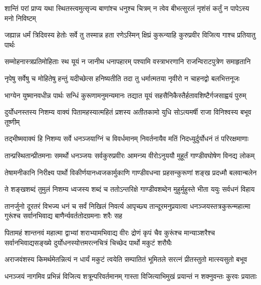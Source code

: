 \twolineshloka
{शान्तिं परां प्राप्य यथा स्थितस्त्वमुत्सृज्य बाणांश्च धनुश्च चित्रम्}
{न त्वेव बीभत्सुरलं नृशंसं कर्तुं न पापेऽस्य मनो निविष्टम्}


\twolineshloka
{जह्यान्न धर्मं त्रिदिवस्य हेतोः सर्वे तु तस्मान्न हता रणेऽस्मिन्}
{क्षिप्रं कुरून्याहि कुरुप्रवीर विजित्य गाश्च प्रतियातु पार्थः}


\twolineshloka
{सम्मोहनास्त्रप्रतिमोहिताः स्थ यूयं न जानीथ धनापहारम्}
{पश्यामि वस्त्राभरणानि राजन्विराटपुत्रेण समाहृतानि}


\twolineshloka
{नृपेषु सर्वेषु च मोहितेषु हन्तुं यदीच्छेत्स हनिष्यतीति}
{तदा तु धर्मात्मतया नृवीरो न चाहनद्वो बलभित्तनूजः}


\twolineshloka
{भाग्येन युष्मानवधीन्न पार्थः सन्धिं कुरूणामनुमन्यमानः}
{तद्यात यूयं सहसैनिकैस्तैर्हतावशिष्टैर्गजसाह्वयं पुरुम्}



\twolineshloka
{दुर्योधनस्तस्य निशम्य वाक्यं पितामहस्यात्महितं प्रशस्य}
{अतीतकामो युधि सोऽत्यमर्षी राजा विनिश्वस्य बभूव तूष्णीम्}


\twolineshloka
{तद्भीष्मवाक्यं हि निशम्य सर्वे धनञ्जयाग्निं च विवर्धमानम्}
{निवर्तनायैव मतिं निदध्युर्दुर्योधनं तं परिरक्षमाणाः}


\twolineshloka
{तान्प्रस्थितान्प्रीतमनाः समर्थो धनञ्जयः सर्वकुरुप्रवीरः}
{आमन्त्र्य वीरोऽनुययौ मुहूर्तं गाण्डीवघोषेण विनद्य लोकम्}


\twolineshloka
{तेषामनीकानि निरीक्ष्य पार्थो विकीर्णयानध्वजकार्मुकाणि}
{गाण्डीवधन्वा प्रहसन्कुरूणां शङ्ख प्रदध्मौ बलवान्बलेन}


\twolineshloka
{ते शङ्खशब्दं तुमुलं निशम्य ध्वजस्य शब्दं च ततोऽन्तरिक्षे}
{गाण्डीवशब्देन मुहुर्मुहुस्ते भीता ययुः सर्वधनं विहाय}


\threelineshloka
{तानर्जुनो दूरतरं विभज्य धनं च सर्वं निखिलं निवर्त्य}
{आपृच्छ्य तान्दूरमनुप्रयात्वा धनञ्जयस्तत्रकुरून्महात्मा}
{गुरूंश्च सर्वानभिवाद्य बाणैर्न्यवर्ततोदग्रमनाः शरैः सह}


\threelineshloka
{पितामहं शान्तनवं महात्मा द्वाभ्यां शराभ्यामभिवाद्य वीरः}
{द्रोणं कृपं चैव कुरूंश्च मान्याञ्शरैश्च सर्वानभिवाद्यसङ्ख्ये}
{दुर्योधनस्योत्तमरत्नचित्रं चिच्छेद पार्थो मकुटं शरौघैः}


\twolineshloka
{अराजवंशस्य किमर्थमेतन्नित्यं न धार्यं मकुटं त्वयेति}
{सम्पातितं भूमितले सरत्नं प्रीतस्तुतो मात्स्यसुतो बभूव}


\twolineshloka
{धनञ्जयं नागमिव प्रभिन्नं विजित्य शत्रून्परिवर्तमानम्}
{गास्ता विजित्याभिमुखं प्रयान्तं न शक्नुवन्तः कुरवः प्रयाताः}


